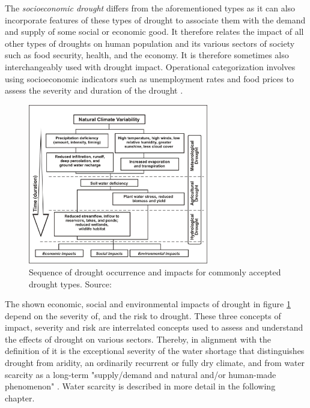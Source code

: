 The \textit{socioeconomic drought} differs from the aforementioned types as it can also incorporate features of these types of drought to associate them with the demand and supply of some social or economic good. It therefore relates the impact of all other types of droughts on human population and its various sectors of society such as food security, health, and the economy. It is therefore sometimes also interchangeably used with drought impact. Operational categorization involves using socioeconomic indicators such as unemployment rates and food prices to assess the severity and duration of the drought \autocite{ndmcTypesDrought2023,wilhiteUnderstandingDroughtPhenomenon1985}.

\begin{figure}[!htp]
    \centering
    \includegraphics[width=0.7\textwidth]{figures/2023_MA_drought_stages.jpg}
    \decoRule
    \caption[Drought Sequences]{Sequence of drought occurrence and impacts for commonly accepted drought types. Source: \autocite{ndmcTypesDrought2023}}
    \label{fig:th_drought_sequences}
\end{figure}

The shown economic, social and environmental impacts of drought in figure \ref{fig:th_drought_sequences} depend on the severity of, and the risk to drought. These three concepts of impact, severity and risk are interrelated concepts used to assess and understand the effects of drought on various sectors. Thereby, in alignment with the definition of \autocite{vanloonDroughtHumanmodifiedWorld2016} it is the exceptional severity of the water shortage that distinguishes drought from aridity, an ordinarily recurrent or fully dry climate, and from water scarcity as a long-term "supply/demand and natural and/or human-made phenomenon" \autocites[7]{idmpDroughtWaterScarcity2022}{vereintenationenSpecialReportDrought2021, vanClimatologicalRiskDroughts2017}. Water scarcity is described in more detail in the following chapter.

